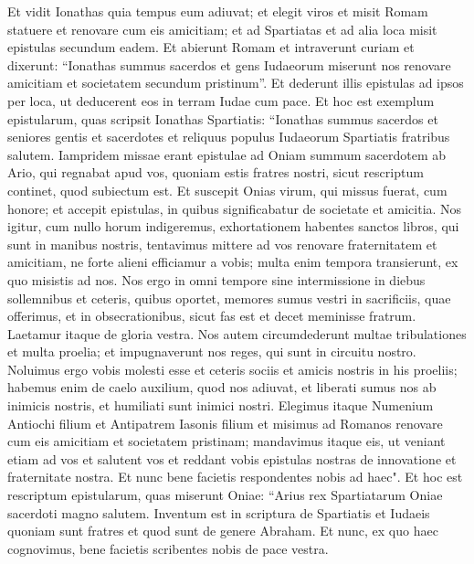 \begin{biblechapter}  
\verse Et vidit Ionathas quia tempus eum adiuvat; et elegit viros et misit Romam statuere et renovare cum eis amicitiam; 
\verse et ad Spartiatas et ad alia loca misit epistulas secundum eadem. 
\verse Et abierunt Romam et intraverunt curiam et dixerunt: “Ionathas summus sacerdos et gens Iudaeorum miserunt nos renovare amicitiam et societatem secundum pristinum”. 
\verse Et dederunt illis epistulas ad ipsos per loca, ut deducerent eos in terram Iudae cum pace. 
\verse Et hoc est exemplum epistularum, quas scripsit Ionathas Spartiatis: 
\verse “Ionathas summus sacerdos et seniores gentis et sacerdotes et reliquus populus Iudaeorum Spartiatis fratribus salutem. 
\verse Iampridem missae erant epistulae ad Oniam summum sacerdotem ab Ario, qui regnabat apud vos, quoniam estis fratres nostri, sicut rescriptum continet, quod subiectum est. 
\verse Et suscepit Onias virum, qui missus fuerat, cum honore; et accepit epistulas, in quibus significabatur de societate et amicitia. 
\verse Nos igitur, cum nullo horum indigeremus, exhortationem habentes sanctos libros, qui sunt in manibus nostris,  
\verse tentavimus mittere ad vos renovare fraternitatem et amicitiam, ne forte alieni efficiamur a vobis; multa enim tempora transierunt, ex quo misistis ad nos. 
\verse Nos ergo in omni tempore sine intermissione in diebus sollemnibus et ceteris, quibus oportet, memores sumus vestri in sacrificiis, quae offerimus, et in obsecrationibus, sicut fas est et decet meminisse fratrum. 
\verse Laetamur itaque de gloria vestra. 
\verse Nos autem circumdederunt multae tribulationes et multa proelia; et impugnaverunt nos reges, qui sunt in circuitu nostro. 
\verse Noluimus ergo vobis molesti esse et ceteris sociis et amicis nostris in his proeliis; 
\verse habemus enim de caelo auxilium, quod nos adiuvat, et liberati sumus nos ab inimicis nostris, et humiliati sunt inimici nostri. 
\verse Elegimus itaque Numenium Antiochi filium et Antipatrem Iasonis filium et misimus ad Romanos renovare cum eis amicitiam et societatem pristinam; 
\verse mandavimus itaque eis, ut veniant etiam ad vos et salutent vos et reddant vobis epistulas nostras de innovatione et fraternitate nostra. 
\verse Et nunc bene facietis respondentes nobis ad haec". 
\verse Et hoc est rescriptum epistularum, quas miserunt Oniae: 
\verse “Arius rex Spartiatarum Oniae sacerdoti magno salutem. 
\verse Inventum est in scriptura de Spartiatis et Iudaeis quoniam sunt fratres et quod sunt de genere Abraham.  
\verse Et nunc, ex quo haec cognovimus, bene facietis scribentes nobis de pace vestra. 

\end{biblechapter}
